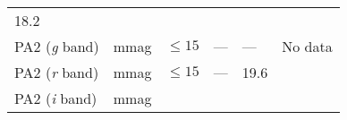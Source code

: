 \documentclass[DM,toc]{lsstdoc}
\begin{document}
\begin{longtable}[]{@{}llllll@{}}
\begin{minipage}[t]{0.12\columnwidth}
18.2\strut
\end{minipage} & \begin{minipage}[t]{0.17\columnwidth}\raggedright\strut
\strut
\end{minipage}\tabularnewline
\begin{minipage}[t]{0.14\columnwidth}\raggedright\strut
PA2 (\emph{g} band)\strut
\end{minipage} & \begin{minipage}[t]{0.06\columnwidth}\raggedright\strut
mmag\strut
\end{minipage} & \begin{minipage}[t]{0.17\columnwidth}\raggedright\strut
\(\leq 15\)\strut
\end{minipage} & \begin{minipage}[t]{0.17\columnwidth}\raggedright\strut
---\strut
\end{minipage} & \begin{minipage}[t]{0.12\columnwidth}\raggedright\strut
---\strut
\end{minipage} & \begin{minipage}[t]{0.17\columnwidth}\raggedright\strut
No data\strut
\end{minipage}\tabularnewline
\begin{minipage}[t]{0.14\columnwidth}\raggedright\strut
PA2 (\emph{r} band)\strut
\end{minipage} & \begin{minipage}[t]{0.06\columnwidth}\raggedright\strut
mmag\strut
\end{minipage} & \begin{minipage}[t]{0.17\columnwidth}\raggedright\strut
\(\leq 15\)\strut
\end{minipage} & \begin{minipage}[t]{0.17\columnwidth}\raggedright\strut
---\strut
\end{minipage} & \begin{minipage}[t]{0.12\columnwidth}\raggedright\strut
19.6\strut
\end{minipage} & \begin{minipage}[t]{0.17\columnwidth}\raggedright\strut
\strut
\end{minipage}\tabularnewline
\begin{minipage}[t]{0.14\columnwidth}\raggedright\strut
PA2 (\emph{i} band)\strut
\end{minipage} & \begin{minipage}[t]{0.06\columnwidth}\raggedright\strut
mmag\strut
\end{minipage} & \begin{minipage}[t]{0.17\columnwidth}\raggedright\strut

\end{minipage}
\end{longtable}
\end{document}
